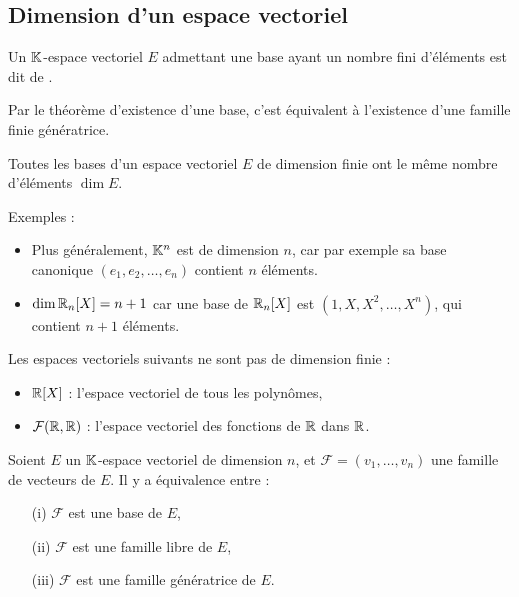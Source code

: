 \documentclass[10pt,class=article,crop=false]{standalone}
\begin{document}
\begin{multicols}{2}
\subsection{Dimension d'un espace vectoriel}


Un $\mathbb{K}$-espace vectoriel $E$ admettant une base ayant un nombre fini
d'éléments est dit de .

Par le théorème d'existence d'une base, c'est équivalent à l'existence d'une
famille finie génératrice.

\begin{theoreme}
	\label{th:dimension}
	Toutes les bases d'un espace vectoriel $E$ de dimension
	finie ont le même nombre d'éléments $\dim E$.
\end{theoreme}

Exemples :
\begin{itemize}
	\item Plus généralement, $\mathbb{K}^n$ est de dimension $n$, car par exemple sa base canonique
	$(e_1,e_2, \ldots ,e_n)$ contient $n$ éléments.
	
	\item $\dim \mathbb{R}_n[X] = n+1$ car une base de $\mathbb{R}_n[X]$ est
	$(1,X,X^2,\ldots,X^n)$, qui contient $n+1$ éléments.
\end{itemize}

Les espaces vectoriels suivants ne sont pas de dimension finie :
\begin{itemize}
	\item $\mathbb{R}[X]$ : l'espace vectoriel de tous les polynômes,
	\item $\mathcal{F}(\mathbb{R},\mathbb{R})$ : l'espace vectoriel des fonctions de $\mathbb{R}$ dans $\mathbb{R}$.
\end{itemize}

\begin{theoreme}
	\label{th:equivbase}
	Soient $E$ un $\mathbb{K}$-espace vectoriel de dimension $n$, et
	$\mathcal{F}=(v_1,\ldots,v_n)$ une famille de  vecteurs de $E$.
	Il y a équivalence entre :
	\begin{itemize}
		\item[(i)] $\mathcal{F}$ est une base de $E$,
		
		\item[(ii)] $\mathcal{F}$ est une famille libre de $E$,
		
		\item[(iii)] $\mathcal{F}$ est une famille génératrice de $E$.
	\end{itemize}
\end{theoreme}



\end{multicols}
\end{document}
